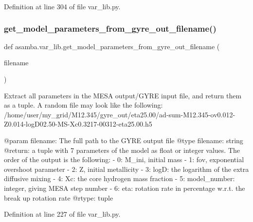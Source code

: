 Definition at line 304 of file var\+\_\+lib.\+py.

\mbox{\label{namespaceasamba_1_1var__lib_a9ee4e5fb223a7df5e7795e850ab0cdcb}} 
\subsubsection{\texorpdfstring{get\+\_\+model\+\_\+parameters\+\_\+from\+\_\+gyre\+\_\+out\+\_\+filename()}{get\_model\_parameters\_from\_gyre\_out\_filename()}}
{\footnotesize\ttfamily def asamba.\+var\+\_\+lib.\+get\+\_\+model\+\_\+parameters\+\_\+from\+\_\+gyre\+\_\+out\+\_\+filename (\begin{DoxyParamCaption}\item[{}]{filename }\end{DoxyParamCaption})}

\begin{DoxyVerb}Extract all parameters in the MESA output/GYRE input file, and return them as a tuple. A random file
may look like the following:
/home/user/my_grid/M12.345/gyre_out/eta25.00/ad-sum-M12.345-ov0.012-Z0.014-logD02.50-MS-Xc0.3217-00312-eta25.00.h5

@param filename: The full path to the GYRE output file
@type filename: string
@return: a tuple with 7 parameters of the model as float or integer values. The order of the 
         output is the following:
         - 0: M_ini, initial mass
         - 1: fov, exponential overshoot parameter
         - 2: Z, initial metallicity
         - 3: logD: the logarithm of the extra diffusive mixing
         - 4: Xc: the core hydrogen mass fraction
         - 5: model_number: integer, giving MESA step number
         - 6: eta: rotation rate in percentage w.r.t. the break up rotation rate
@rtype: tuple
\end{DoxyVerb}
 

Definition at line 227 of file var\+\_\+lib.\+py.

\mbox{\label{namespaceasamba_1_1var__lib_af9d74851b62f321dbf694bd2ef8fa3ed}} 
